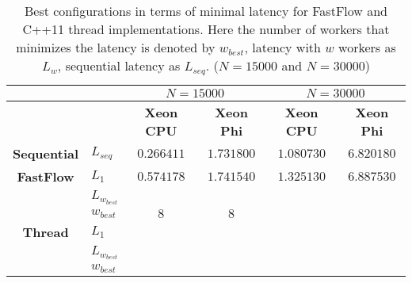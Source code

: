 \begin{table}[h]
	\centering
	\begin{tabular}{clcccc}  
		\toprule
		& & \multicolumn{2}{c}{\textbf{$N = 15000$}} & \multicolumn{2}{c}{\textbf{$N = 30000$}}\\
		\midrule
		& & \textbf{Xeon CPU} & \textbf{Xeon Phi} & \textbf{Xeon CPU} & \textbf{Xeon Phi}\\
		\cmidrule{3-6}		
		\textbf{Sequential} & $L_{seq}$ & $0.266411$& $1.731800$ & $1.080730$& $6.820180$\\
		\midrule
		\textbf{FastFlow} & $L_1$ & $0.574178$ & $1.741540$ & $1.325130$ & $6.887530$\\
		& $L_{w_{best}}$ & $ $ & $ $ & $ $ & $ $\\
		& $w_{best}$ & $8$ & $8$ & $ $ & $ $\\
		\midrule
		\textbf{Thread} & $L_1$ & $ $ & $ $ & $ $ & $ $\\
		& $L_{w_{best}}$ & $ $ & $ $ & $ $ & $ $\\
		& $w_{best}$ & $ $ & $ $ & $ $ & $ $ \\
		\bottomrule
	\end{tabular}
	\caption{Best configurations in terms of minimal latency for FastFlow and C++11 thread implementations. 
		Here the number of workers that minimizes the latency is denoted by $w_{best}$, latency with $w$ workers as $L_w$, sequential latency as $L_{seq}$. ($N = 15000$ and $N=30000$)}
	\label{tab:res1}
\end{table}
